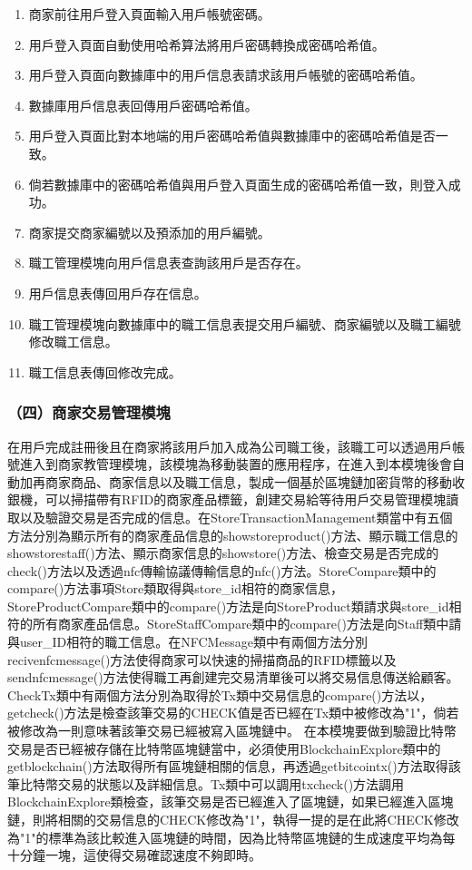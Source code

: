 	\begin{enumerate}
	\item 商家前往用戶登入頁面輸入用戶帳號密碼。
	\item 用戶登入頁面自動使用哈希算法將用戶密碼轉換成密碼哈希值。
	\item 用戶登入頁面向數據庫中的用戶信息表請求該用戶帳號的密碼哈希值。
	\item 數據庫用戶信息表回傳用戶密碼哈希值。
	\item 用戶登入頁面比對本地端的用戶密碼哈希值與數據庫中的密碼哈希值是否一致。
	\item 倘若數據庫中的密碼哈希值與用戶登入頁面生成的密碼哈希值一致，則登入成功。
	\item 商家提交商家編號以及預添加的用戶編號。
	\item 職工管理模塊向用戶信息表查詢該用戶是否存在。
	\item 用戶信息表傳回用戶存在信息。
	\item 職工管理模塊向數據庫中的職工信息表提交用戶編號、商家編號以及職工編號修改職工信息。
	\item 職工信息表傳回修改完成。
	\end{enumerate}

\subsubsection{（四）商家交易管理模塊}
在用戶完成註冊後且在商家將該用戶加入成為公司職工後，該職工可以透過用戶帳號進入到商家教管理模塊，該模塊為移動裝置的應用程序，在進入到本模塊後會自動加再商家商品、商家信息以及職工信息，製成一個基於區塊鏈加密貨幣的移動收銀機，可以掃描帶有RFID的商家產品標籤，創建交易給等待用戶交易管理模塊讀取以及驗證交易是否完成的信息。在StoreTransactionManagement類當中有五個方法分別為顯示所有的商家產品信息的showstoreproduct()方法、顯示職工信息的showstorestaff()方法、顯示商家信息的showstore()方法、檢查交易是否完成的check()方法以及透過nfc傳輸協議傳輸信息的nfc()方法。StoreCompare類中的compare()方法事項Store類取得與store\_id相符的商家信息，StoreProductCompare類中的compare()方法是向StoreProduct類請求與store\_id相符的所有商家產品信息。StoreStaffCompare類中的compare()方法是向Staff類中請與user\_ID相符的職工信息。在NFCMessage類中有兩個方法分別recivenfcmessage()方法使得商家可以快速的掃描商品的RFID標籤以及sendnfcmessage()方法使得職工再創建完交易清單後可以將交易信息傳送給顧客。CheckTx類中有兩個方法分別為取得於Tx類中交易信息的compare()方法以，getcheck()方法是檢查該筆交易的CHECK值是否已經在Tx類中被修改為"1"，倘若被修改為一則意味著該筆交易已經被寫入區塊鏈中。
在本模塊要做到驗證比特幣交易是否已經被存儲在比特幣區塊鏈當中，必須使用BlockchainExplore類中的getblockchain()方法取得所有區塊鏈相關的信息，再透過getbitcointx()方法取得該筆比特幣交易的狀態以及詳細信息。Tx類中可以調用txcheck()方法調用BlockchainExplore類檢查，該筆交易是否已經進入了區塊鏈，如果已經進入區塊鏈，則將相關的交易信息的CHECK修改為"1"，執得一提的是在此將CHECK修改為"1"的標準為該比較進入區塊鏈的時間，因為比特幣區塊鏈的生成速度平均為每十分鐘一塊，這使得交易確認速度不夠即時。

